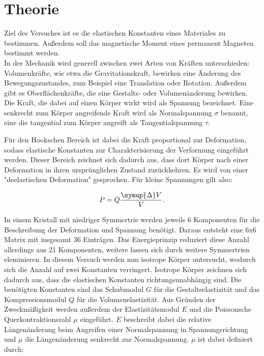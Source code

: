 \section{Theorie}
\label{sec:Theorie}

Ziel des Versuches ist es die elastischen Konstanten eines Materiales zu bestimmen.
Außerdem soll das magnetische Moment eines permanent Magneten bestimmt werden. \\

In der Mechanik wird generell zwischen zwei Arten von Kräften unterschieden: 
Volumenkräfte, wie etwa die Gravitationskraft, bewirken eine Änderung des 
Bewegungszustandes, zum Beispiel eine Translation oder Rotation. 
Außerdem gibt es Oberflächenkräfte, die eine Gestalts- oder Volumenänderung 
bewirken. Die Kraft, die dabei auf einen Körper wirkt wird als Spannung bezeichnet. 
Eine senkrecht zum Körper angreifende Kraft wird als Normalspannung $\sigma$ benannt, 
eine die tangential zum Körper angreift als Tangentialspannung $\tau$. 

Für den Hookschen Bereich ist dabei die Kraft proportional zur Deformation, sodass 
elastische Konstanten zur Charakterisierung der Verformung eingeführt werden. 
Dieser Bereich zeichnet sich dadurch aus, dass dort Körper nach einer Deformation in 
ihren ursprünglichen Zustand zurückkehren. Es wird von einer "deelastischen 
Deformation" gesprochen. Für kleine Spannungen gilt also: 

\begin{equation*}
P = Q \frac{\symup{\Delta}V}{V}.
\end{equation*}

In einem Kristall mit niedriger Symmertrie werden jeweils 6 Komponenten für die 
Beschreibung der Deformation und Spannung benötigt. Daraus entsteht eine 6x6 Matrix 
mit insgesamt 36 Einträgen. Das Energieprinzip reduziert diese Anzahl allerdings 
aus 21 Komponenten, weitere lassen sich durch weitere Symmertrien eleminieren. 
In diesem Versuch werden nun isotrope Körper untersucht, wodurch sich die Anzahl 
auf zwei Konstanten verringert. Isotrope Körper zeichnen sich dadurch aus, dass die 
elastischen Konstanten richtungsunabhängig sind. 
Die benötigten Konstanten sind das Schubmodul $G$ für die Gestaltselastizität und 
das Kompressionsmodul $Q$ für die Volumenelastizität. Aus Gründen der Zweckmäßigkeit
werden außerdem der Elastizitätsmodul $E$ und die Poissonsche Querkontraktionszahl 
$\mu$ eingeführt. $E$ beschreibt dabei die relative Längenänderung beim Angreifen 
einer Normalspannung in Spannungsrichtung und $\mu$ die Längenänderung senkrecht 
zur Normalspannung. $\mu$ ist dabei definiert durch: 

